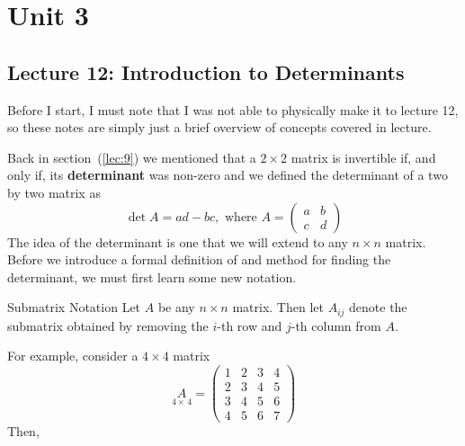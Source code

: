 \section{Unit 3}
\subsection{Lecture 12: Introduction to Determinants}

\begin{impbox}{}{}
    Before I start, I must note that I was not able to physically make it to lecture 12, so these notes are simply just a brief overview of concepts covered in lecture.
\end{impbox}

Back in section~(\ref{lec:9}) we mentioned that a $2 \times 2$ matrix is invertible if, and only if, its \textbf{determinant} was non-zero and we defined the determinant of a two by two matrix as 
\[
    \det{A} = ad - bc, \text{ where } A = \begin{pmatrix}
        a & b \\ c & d
    \end{pmatrix}
\]
The idea of the determinant is one that we will extend to any $n \times n$ matrix. Before we introduce a formal definition of and method for finding the determinant, we must first learn some new notation. 

\begin{defbox}{Submatrix Notation}{}
    Let $A$ be any $n \times n$ matrix. Then let $A_{ij}$ denote the submatrix obtained by removing the $i$-th row and $j$-th column from $A$. 
\end{defbox}

For example, consider a $4 \times 4$ matrix 
\[
    \underset{4\times\,4}{A} = \begin{pmatrix}
        1 & 2 & 3 & 4 \\
        2 & 3 & 4 & 5 \\
        3 & 4 & 5 & 6 \\
        4 & 5 & 6 & 7
    \end{pmatrix}
\]
Then, 

